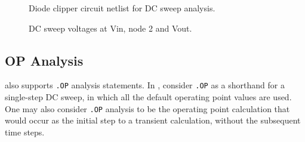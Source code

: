 \begin{figure}[htbp]
\begin{centering}
\caption{Diode clipper circuit netlist for DC sweep analysis.\label{Clipper_Netlist3}}

\end{centering}
\end{figure}

\begin{figure}[htbp]
\begin{centering}
\caption{DC sweep voltages at Vin, node 2 and Vout.\label{Clipper_DCSweep2}}
\end{centering}
\end{figure}

\subsection{OP Analysis}
\label{OP_Analysis}

\Xyce{} also supports \texttt{.OP} analysis statements.  In \Xyce{},
consider \texttt{.OP} as a shorthand for a single-step DC sweep, in
which all the default operating point values are used.  One may also
consider \texttt{.OP} analysis to be the operating point calculation
that would occur as the initial step to a transient calculation,
without the subsequent time steps.

